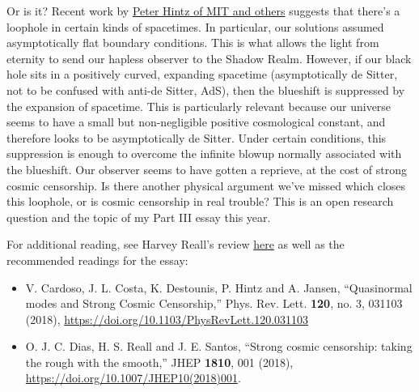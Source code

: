 Or is it? Recent work by \href{https://news.berkeley.edu/2018/02/20/some-black-holes-erase-your-past/}{Peter Hintz of MIT and others} suggests that there's a loophole in certain kinds of spacetimes. In particular, our solutions assumed asymptotically flat boundary conditions. This is what allows the light from eternity to send our hapless observer to the Shadow Realm. However, if our black hole sits in a positively curved, expanding spacetime (asymptotically de Sitter, not to be confused with anti-de Sitter, AdS), then the blueshift is suppressed by the expansion of spacetime. This is particularly relevant because our universe seems to have a small but non-negligible positive cosmological constant, and therefore looks to be asymptotically de Sitter. Under certain conditions, this suppression is enough to overcome the infinite blowup normally associated with the blueshift. Our observer seems to have gotten a reprieve, at the cost of strong cosmic censorship. Is there another physical argument we've missed which closes this loophole, or is cosmic censorship in real trouble? This is an open research question and the topic of my Part III essay this year.

For additional reading, see Harvey Reall's review \href{https://physics.aps.org/articles/v11/6}{here} as well as the recommended readings for the essay:
\begin{itemize}
    \item V. Cardoso, J. L. Costa, K. Destounis, P. Hintz and A. Jansen, ``Quasinormal modes and Strong Cosmic Censorship,'' Phys. Rev. Lett. \textbf{120}, no. 3, 031103 (2018), \url{https://doi.org/10.1103/PhysRevLett.120.031103}
    \item O. J. C. Dias, H. S. Reall and J. E. Santos, “Strong cosmic censorship: taking the rough with the smooth,” JHEP \textbf{1810}, 001 (2018), \url{https://doi.org/10.1007/JHEP10(2018)001}.
\end{itemize}
